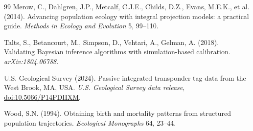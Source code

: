 \documentclass[11pt]{article}
\newcommand{\doi}[1]{\href{https://doi.org/#1}{doi:#1}}
\begin{document}
\begin{thebibliography}{99}
 Merow, C., Dahlgren, J.P., Metcalf,
C.J.E., Childs, D.Z., Evans, M.E.K., et al. (2014). Advancing population ecology
with integral projection models: a practical guide. \emph{Methods in Ecology and
Evolution} 5, 99--110.

 Talts, S., Betancourt, M., Simpson, D.,
Vehtari, A., Gelman, A. (2018). Validating Bayesian inference algorithms with
simulation-based calibration. \emph{arXiv:1804.06788}.

 U.S. Geological Survey
(2024). Passive integrated transponder tag data from the West Brook, MA, USA.
\emph{U.S. Geological Survey data release}, \doi{10.5066/P14PDHXM}.

 Wood, S.N. (1994). Obtaining birth and mortality
patterns from structured population trajectories. \emph{Ecological Monographs}
64, 23--44.
\end{thebibliography}
\end{document}
